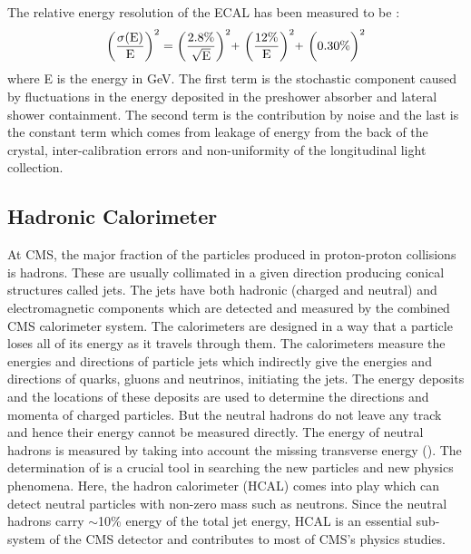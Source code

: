 The relative energy resolution of the ECAL has been measured to be \cite{Adzic:2007mi} :
\begin{equation}
{\rm \bigg(\frac{\sigma(E)}{E}\bigg)^2 = \bigg(\frac{2.8\%}{\sqrt{E}}\bigg)^2 \plus \bigg(\frac{12\%}{E}\bigg)^2 \plus \bigg(0.30\%\bigg)^2}
\end{equation}
where E is the energy in GeV. The first term is the stochastic component caused by fluctuations in the energy deposited in the preshower absorber and lateral shower containment. The second term is the contribution by noise and the last is the constant term which comes from leakage of energy from the back of the crystal, inter-calibration errors and non-uniformity of the longitudinal light collection. 

\subsection{Hadronic Calorimeter}
At CMS, the major fraction of the particles produced in proton-proton collisions is hadrons. These are usually collimated in a given direction producing conical structures called jets. The jets have both hadronic (charged and neutral) and electromagnetic components which are detected and measured by the combined CMS calorimeter system. The calorimeters are designed in a way that a particle loses all of its energy as it travels through them. The calorimeters measure the energies and directions of particle jets which indirectly give the energies and directions of quarks, gluons and neutrinos, initiating the jets. The energy deposits and the locations of these deposits are used to determine the directions and momenta of charged particles. But the neutral hadrons do not leave any track and hence their energy cannot be measured directly. The energy of neutral hadrons is measured by taking into account the missing transverse energy (\ETmiss). The determination of \ETmiss is a crucial tool in searching the new particles and new physics phenomena. Here, the hadron calorimeter (HCAL) comes into play which can detect neutral particles with non-zero mass such as neutrons. Since the neutral hadrons carry $\sim$10\% energy of the total jet energy, HCAL is an essential sub-system of the CMS detector and contributes to most of CMS's physics studies.

